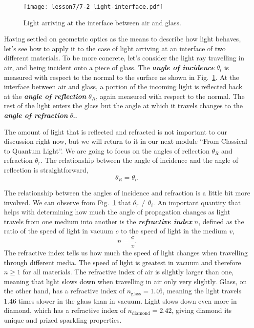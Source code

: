 \begin{figure}[t]
    \centering
    \texttt{[image: lesson7/7-2\_light-interface.pdf]}
    \caption[Angle of incidence.]{Light arriving at the interface between air and glass.}
    \label{fig:7-2_interface}
\end{figure}

Having settled on geometric optics as the means to describe how light behaves, let's see how to apply it to the case of light arriving at an interface of two different materials.
To be more concrete, let's consider the light ray travelling in air, and being incident onto a piece of glass.
The \textbf{\emph{angle of incidence}} $\theta_i$ is measured with respect to the normal to the surface as shown in Fig.~\ref{fig:7-2_interface}.
At the interface between air and glass, a portion of the incoming light is reflected back at the \textbf{\emph{angle of reflection}} $\theta_R$, again measured with respect to the normal.
The rest of the light enters the glass but the angle at which it travels changes to the \textbf{\emph{angle of refraction}} $\theta_r$.

The amount of light that is reflected and refracted is not important to our discussion right now, but we will return to it in our next module ``From Classical to Quantum Light''.
We are going to focus on the angles of reflection $\theta_R$ and refraction $\theta_r$.
The relationship between the angle of incidence and the angle of reflection is straightforward,
\begin{equation}
    \theta_R = \theta_i.
\end{equation}

The relationship between the angles of incidence and refraction is a little bit more involved.
We can observe from Fig.~\ref{fig:7-2_interface} that $\theta_r \neq \theta_i$.
An important quantity that helps with determining how much the angle of propagation changes as light travels from one medium into another is the \textbf{\emph{refractive index}} $n$, defined as the ratio of the speed of light in vacuum $c$ to the speed of light in the medium $v$,
\begin{equation}
    n = \frac{c}{v}.
    \label{eq:7-2_refractive_index}
\end{equation}
The refractive index tells us how much the speed of light changes when travelling through different media.
The speed of light is greatest in vacuum and therefore $n\geq 1$ for all materials.
The refractive index of air is slightly larger than one, meaning that light slows down when travelling in air only very slightly.
Glass, on the other hand, has a refractive index of $n_{\text{glass}} = 1.46$, meaning the light travels 1.46 times slower in the glass than in vacuum.
Light slows down even more in diamond, which has a refractive index of $n_{\text{diamond}} = 2.42$, giving diamond its unique and prized sparkling properties.

